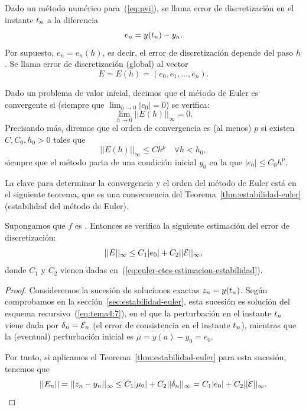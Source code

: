 \begin{definition}
  \label{def:error-discretizacion-euler}
  Dado un método numérico para~(\ref{eq:pvi}), se llama error de
  discretización en el instante ${t_n}$ a la diferencia
  \begin{equation*}
    e_n = y({t_n})-{y_n}.
  \end{equation*}
  Por supuesto, $e_n=e_n(h)$, es decir, el error de discretización
  depende del paso $h$. Se llama error de discretización (global) al
  vector
  \begin{equation*}
    E = E(h) = (e_0,e_1,...,e_n).
  \end{equation*}
\end{definition}
\begin{definition}
  \label{def:convergencia-euler}
  Dado un problema de valor inicial, decimos que el método de Euler es
  convergente si (siempre que $\lim_{h\to 0} |e_0|=0$) se verifica:
  \begin{equation*}
    \lim_{h\to 0} ||E(h)||_\infty = 0.
  \end{equation*}
  Precisando más, diremos que el orden de convergencia es (al menos)
  $p$ si existen $C, C_0, h_0>0$ tales que
  \begin{equation*}
    ||E(h)||_\infty \le C h^p \quad \forall h<h_0,
  \end{equation*}
  siempre que el método parta de una condición inicial $y_0$ en la que
  $|e_0|\le C_0 h^p$.
\end{definition}

La clave para determinar la convergencia y el orden del método de
Euler está en el siguiente teorema, que es una consecuencia del
Teorema~\ref{thm:estabilidad-euler} (estabilidad del método de Euler).
\begin{theorem}
  \label{thm:euler:estimacion-error-discretizacion}
  Supongamos que $f$ es \globLipschitz. Entonces se verifica la
  siguiente estimación del error de discretización:
  \begin{equation}
    \label{eq:estimacion-discretizacion}
    ||E||_\infty \le C_1 |e_0| + C_2 ||{\cal E}||_\infty,
  \end{equation}
  donde $C_1$ y $C_2$ vienen dadas
  en~(\ref{eq:euler-ctes-estimacion-estabilidad}).
\end{theorem}
\begin{proof}
  Consideremos la sucesión de soluciones exactas $z_n=y({t_n})$. Según
  comprobamos en la sección~\ref{sec:estabilidad-euler}, esta sucesión
  es solución del esquema recursivo~(\ref{eq:tema4:7}), en el que la
  perturbación en el instante ${t_n}$ viene dada por
  $\delta_n={\cal E}_n$ (el error de consistencia en el instante
  ${t_n}$), mientras que la (eventual) perturbación inicial es
  $\mu=y(a)-y_0=e_0$.

  Por tanto, si aplicamos el Teorema~\ref{thm:estabilidad-euler} para
  esta sucesión, tenemos que
  $$
  ||E_n|| = ||{z_n} - {y_n}||_\infty \le C_1|\mu_0| + C_2
  ||\delta_n||_\infty  = C_1|e_0| + C_2 ||{\cal E}||_\infty.
  $$
\end{proof}

